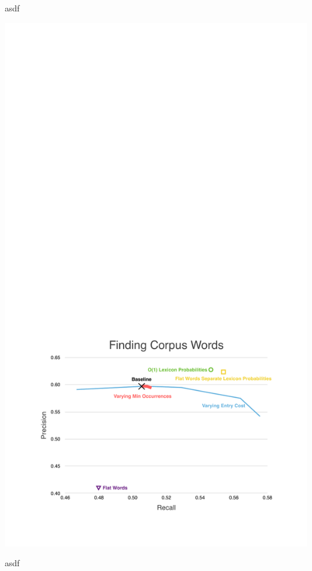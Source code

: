 \documentclass[11pt, oneside, fleqn]{article}
\begin{document}
asdf

  \includegraphics{./figure/finding_corpus_word.pdf}

asdf
\end{document}
